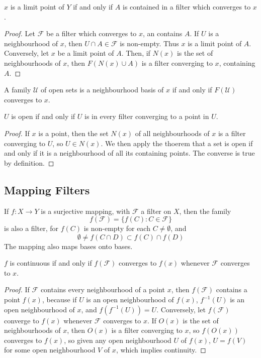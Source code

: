 \begin{lemma}
    $x$ is a limit point of $Y$ if and only if $A$ is contained in a filter which converges to $x$.
\end{lemma}
\begin{proof}
    Let $\mathcal{F}$ be a filter which converges to $x$, an contains $A$. If $U$ is a neighbourhood of $x$, then $U \cap A \in \mathcal{F}$ is non-empty. Thus $x$ is a limit point of $A$. Conversely, let $x$ be a limit point of $A$. Then, if $N(x)$ is the set of neighbourhoods of $x$, then $F(N(x) \cup A)$ is a filter converging to $x$, containing $A$.
\end{proof}

\begin{example}
    A family $\mathcal{U}$ of open sets is a neighbourhood basis of $x$ if and only if $F(\mathcal{U})$ converges to $x$.
\end{example}

\begin{theorem}
    $U$ is open if and only if $U$ is in every filter converging to a point in $U$.
\end{theorem}
\begin{proof}
    If $x$ is a point, then the set $N(x)$ of all neighbourhoods of $x$ is a filter converging to $U$, so $U \in N(x)$. We then apply the thoerem that a set is open if and only if it is a neighbourhood of all its containing points. The converse is true by definition.
\end{proof}

\subsection{Mapping Filters}

If $f: X \to Y$ is a surjective mapping, with $\mathcal{F}$ a filter on $X$, then the family
%
\[ f(\mathcal{F}) = \{ f(C) : C \in \mathcal{F} \} \]
%
is also a filter, for $f(C)$ is non-empty for each $C \neq \emptyset$, and
%
\[ \emptyset \neq f(C \cap D) \subset f(C) \cap f(D) \]
%
The mapping also maps bases onto bases.

\begin{theorem}
    $f$ is continuous if and only if $f(\mathcal{F})$ converges to $f(x)$ whenever $\mathcal{F}$ converges to $x$.
\end{theorem}
\begin{proof}
    If $\mathcal{F}$ contains every neighbourhood of a point $x$, then $f(\mathcal{F})$ contains a point $f(x)$, because if $U$ is an open neighbourhood of $f(x)$, $f^{-1}(U)$ is an open neighbourhood of $x$, and $f(f^{-1}(U)) = U$. Conversely, let $f(\mathcal{F})$ converge to $f(x)$ whenever $\mathcal{F}$ converges to $x$. If $O(x)$ is the set of neighbourhoods of $x$, then $O(x)$ is a filter converging to $x$, so $f(O(x))$ converges to $f(x)$, so given any open neighbourhood $U$ of $f(x)$, $U = f(V)$ for some open neighbourhood $V$ of $x$, which implies continuity.
\end{proof}

